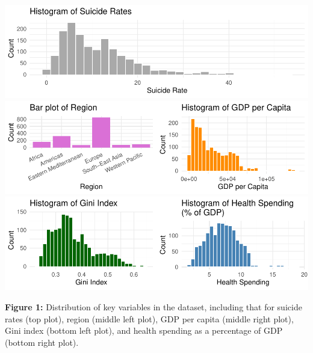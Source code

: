 \documentclass[
]{article}
\begin{document}
\includegraphics{final_report_files/figure-latex/variable-distributions-1.pdf}
\includegraphics{final_report_files/figure-latex/variable-distributions-2.pdf}
\includegraphics{final_report_files/figure-latex/variable-distributions-3.pdf}

\textbf{Figure 1:} Distribution of key variables in the dataset,
including that for suicide rates (top plot), region (middle left plot),
GDP per capita (middle right plot), Gini index (bottom left plot), and
health spending as a percentage of GDP (bottom right plot).

\newpage
\end{document}
